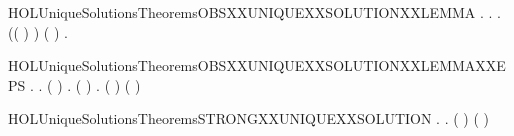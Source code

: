 \begin{SaveVerbatim}{HOLUniqueSolutionsTheoremsOBSXXUNIQUEXXSOLUTIONXXLEMMA}
\HOLTokenTurnstile{} \HOLSymConst{\HOLTokenForall{}}.
         \HOLSymConst{\HOLTokenConj{}}   \HOLSymConst{\HOLTokenImp{}}
       \HOLSymConst{\HOLTokenForall{}}  .
             \HOLTokenTransBegin{}\HOLTokenTransEnd {} \HOLSymConst{\HOLTokenImp{}}
           \HOLSymConst{\HOLTokenExists{}}.
                 \HOLSymConst{\HOLTokenConj{}} (( \HOLSymConst{=} \HOLConst{\ensuremath{\tau}}) \HOLSymConst{\HOLTokenImp{}}  ) \HOLSymConst{\HOLTokenConj{}} ( \HOLSymConst{=}  ) \HOLSymConst{\HOLTokenConj{}}
               \HOLSymConst{\HOLTokenForall{}}.   \HOLTokenTransBegin{}\HOLTokenTransEnd {} 
\end{SaveVerbatim}
\newcommand{\HOLUniqueSolutionsTheoremsOBSXXUNIQUEXXSOLUTIONXXLEMMA}{\UseVerbatim{HOLUniqueSolutionsTheoremsOBSXXUNIQUEXXSOLUTIONXXLEMMA}}
\begin{SaveVerbatim}{HOLUniqueSolutionsTheoremsOBSXXUNIQUEXXSOLUTIONXXLEMMAXXEPS}
\HOLTokenTurnstile{} \HOLSymConst{\HOLTokenForall{}}.
         \HOLSymConst{\HOLTokenConj{}}   \HOLSymConst{\HOLTokenImp{}}
       \HOLSymConst{\HOLTokenForall{}} .
            ( )  \HOLSymConst{\HOLTokenImp{}}
           \HOLSymConst{\HOLTokenExists{}}.   \HOLSymConst{\HOLTokenConj{}}   \HOLSymConst{\HOLTokenConj{}} ( \HOLSymConst{=}  ) \HOLSymConst{\HOLTokenConj{}} \HOLSymConst{\HOLTokenForall{}}.  ( ) ( )
\end{SaveVerbatim}
\newcommand{\HOLUniqueSolutionsTheoremsOBSXXUNIQUEXXSOLUTIONXXLEMMAXXEPS}{\UseVerbatim{HOLUniqueSolutionsTheoremsOBSXXUNIQUEXXSOLUTIONXXLEMMAXXEPS}}
\begin{SaveVerbatim}{HOLUniqueSolutionsTheoremsSTRONGXXUNIQUEXXSOLUTION}
\HOLTokenTurnstile{} \HOLSymConst{\HOLTokenForall{}}.
         \HOLSymConst{\HOLTokenImp{}}
       \HOLSymConst{\HOLTokenForall{}} .
             ( ) \HOLSymConst{\HOLTokenConj{}}   ( ) \HOLSymConst{\HOLTokenImp{}}
             
\end{SaveVerbatim}
